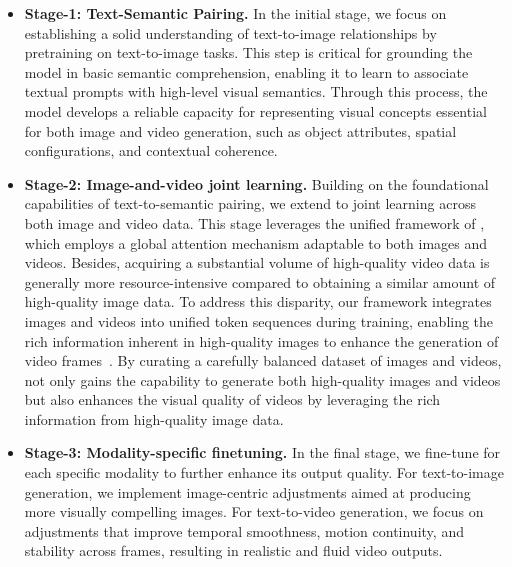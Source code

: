 \begin{itemize}[align=parleft, left=0pt, labelsep=0.5em]
    \item \textbf{Stage-1: Text-Semantic Pairing.} In the initial stage, we focus on establishing a solid understanding of text-to-image relationships by pretraining \ours on text-to-image tasks. This step is critical for grounding the model in basic semantic comprehension, enabling it to learn to associate textual prompts with high-level visual semantics. Through this process, the model develops a reliable capacity for representing visual concepts essential for both image and video generation, such as object attributes, spatial configurations, and contextual coherence.

    \item \textbf{Stage-2: Image-and-video joint learning.} Building on the foundational capabilities of text-to-semantic pairing, we extend \ours to joint learning across both image and video data. This stage leverages the unified framework of \ours, which employs a global attention mechanism adaptable to both images and videos. Besides, acquiring a substantial volume of high-quality video data is generally more resource-intensive compared to obtaining a similar amount of high-quality image data. To address this disparity, our framework integrates images and videos into unified token sequences during training, enabling the rich information inherent in high-quality images to enhance the generation of video frames~\citep{chen2024gentron}. By curating a carefully balanced dataset of images and videos, \ours not only gains the capability to generate both high-quality images and videos but also enhances the visual quality of videos by leveraging the rich information from high-quality image data.

    \item \textbf{Stage-3: Modality-specific finetuning.} In the final stage, we fine-tune \ours for each specific modality to further enhance its output quality. For text-to-image generation, we implement image-centric adjustments aimed at producing more visually compelling images. For text-to-video generation, we focus on adjustments that improve temporal smoothness, motion continuity, and stability across frames, resulting in realistic and fluid video outputs.

\end{itemize}

